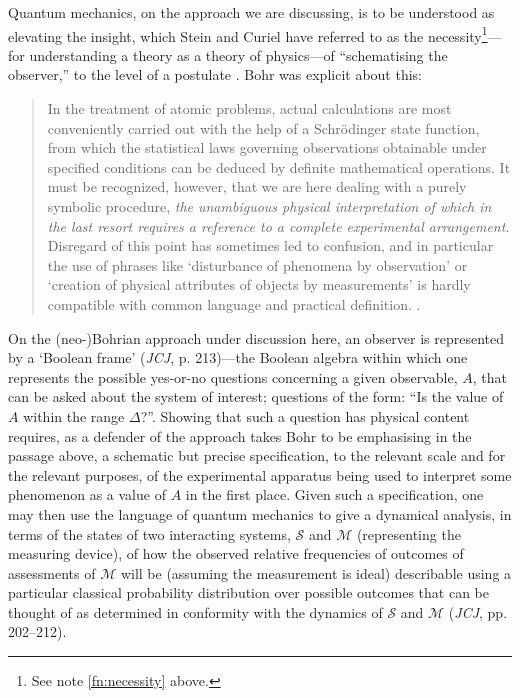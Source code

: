 \documentclass[12pt,english,twoside]{article}
\numberwithin{equation}{section}
\begin{document}

Quantum mechanics, on the approach we are discussing, is to be understood as elevating the insight, which Stein and Curiel have referred to as the necessity\footnote{See note \ref{fn:necessity} above.}---for understanding a theory as a theory of physics---of ``schematising the observer,'' to the level of a postulate \citep[cf.][]{hansenWolfFeatureNotBug}. Bohr was explicit about this:

\begin{quote}
In the treatment of atomic problems, actual calculations are most conveniently carried out with the help of a Schr\"odinger state function, from which the statistical laws governing observations obtainable under specified conditions can be deduced by definite mathematical operations. It must be recognized, however, that we are here dealing with a purely symbolic procedure, \emph{the unambiguous physical interpretation of which in the last resort requires a reference to a complete experimental arrangement.} Disregard of this point has sometimes led to confusion, and in particular the use of phrases like `disturbance of phenomena by observation' or `creation of physical attributes of objects by measurements' is hardly compatible with common language and practical definition. \citep[][pp.\ 392--393, our emphasis]{bohr1958}.
\end{quote}

On the (neo-)Bohrian approach under discussion here, an observer is represented by a `Boolean frame' (\emph{JCJ}, p. 213)---the Boolean algebra within which one represents the possible yes-or-no questions concerning a given observable, $A$, that can be asked about the system of interest; questions of the form: ``Is the value of $A$ within the range $\Delta$?''. Showing that such a question has physical content requires, as a defender of the approach takes Bohr to be emphasising in the passage above, a schematic but precise specification, to the relevant scale and for the relevant purposes, of the experimental apparatus being used to interpret some phenomenon as a value of $A$ in the first place. Given such a specification, one may then use the language of quantum mechanics to give a dynamical analysis, in terms of the states of two interacting systems, $\mathcal{S}$ and $\mathcal{M}$ (representing the measuring device), of how the observed relative frequencies of outcomes of assessments of $\mathcal{M}$ will be (assuming the measurement is ideal) describable using a particular classical probability distribution over possible outcomes that can be thought of as determined in conformity with the dynamics of $\mathcal{S}$ and $\mathcal{M}$ (\emph{JCJ}, pp. 202--212).
\end{document}
